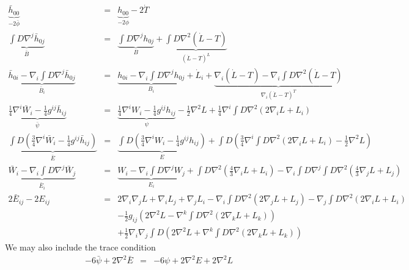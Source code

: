 \documentclass[10pt,letterpaper]{article}
\numberwithin{equation}{section}
\begin{document}
\begin{appendices}
\begin{eqnarray}
\underbrace{\bar h_{00}}_{-2\bar\phi } &=& \underbrace{h_{00}}_{-2\phi} - 2\dot T
\nonumber\\
\underbrace{\int D \nabla^j \bar h_{0j}}_{\bar B} &=& \underbrace{\int D \nabla^j h_{0j}}_B + \underbrace{\int D \nabla^2(\dot L-T)}_{(\dot L-T)^L}
\nonumber\\
\underbrace{\bar h_{0i} - \nabla_i \int D \nabla^j \bar h_{0j}}_{\bar B_i} &=&
\underbrace{h_{0i} - \nabla_i \int D \nabla^j  h_{0j}}_{B_i} +\dot L_i +\underbrace{ \nabla_i(\dot L -T)
-\nabla_i \int D \nabla^2(\dot L-T)}_{\nabla_i (\dot L-T)^T}
\nonumber\\
\underbrace{\tfrac14 \nabla^i \bar W_i - \tfrac14 g^{ij}\bar h_{ij}}_{\bar\psi} &=& \underbrace{ \tfrac14 \nabla^i W_i - \tfrac14 g^{ij}h_{ij}}_{\psi} - \tfrac12 \nabla^2 L+  \tfrac14 \nabla^i \int D \nabla^2( 2\nabla_i L + L_i) 
\nonumber\\
\underbrace{\int D(\tfrac34 \nabla^i \bar W_i - \tfrac14 g^{ij}\bar  h_{ij})}_{\bar E} &=&
\underbrace{\int D(\tfrac34 \nabla^i W_i - \tfrac14 g^{ij}h_{ij})}_{ E} 
 + \int D \left( \tfrac34 \nabla^i \int D \nabla^2 (2\nabla_i L + L_i) - \tfrac12 \nabla^2 L\right)
\nonumber\\
\underbrace{\bar W_i - \nabla_i \int D \nabla^j \bar W_j}_{\bar E_i}
&=&
\underbrace{ W_i - \nabla_i \int D \nabla^j W_j}_{ E_i}
+ \int D\nabla^2 (\tfrac43 \nabla_i L + L_i) - \nabla_i \int D \nabla^j \int D\nabla^2 (\tfrac43 \nabla_j L + L_j)
\nonumber\\
2\bar E_{ij} - 2E_{ij} &=& 2\nabla_i \nabla_j L + \nabla_i L_j + \nabla_j L_i
-\nabla_i \int D\nabla^2 (2\nabla_j L + L_j) - \nabla_j \int D \nabla^2 (2\nabla_i L + L_i)
\nonumber\\
&&-\tfrac12 g_{ij}\left( 2 \nabla^2 L - \nabla^k \int D \nabla^2( 2\nabla_k L + L_k)\right)
\nonumber\\
&& + \tfrac12 \nabla_i \nabla_j \int D \left( 2\nabla^2 L + \nabla^k \int D \nabla^2 (2\nabla_k L +L_k)\right)
\label{svtgauge1}
\end{eqnarray}
We may also include the trace condition
\begin{eqnarray}
-6\bar \psi + 2\nabla^2 \bar E &=& -6 \psi + 2\nabla^2 E +2 \nabla^2 L
\end{eqnarray}


\end{appendices}
\end{document}
